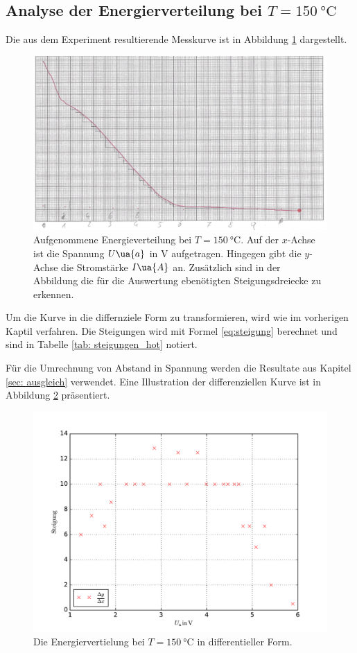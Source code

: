 \subsection{Analyse der Energierverteilung bei $T=\SI{150}{\celsius}$}
\FloatBarrier
Die aus dem Experiment resultierende Messkurve ist in Abbildung \ref{fig: messkurve_energie_hot} dargestellt. \\
\begin{figure}
  \centering
  \includegraphics[width=0.8 \textwidth]{./pics/energieverteilung_hot.png}
  \caption{Aufgenommene Energieverteilung bei $T=\SI{150}{\celsius}$. Auf der $x$-Achse ist die Spannung $U\ua{a}$ in $\si{\volt}$ aufgetragen.
          Hingegen gibt die $y$-Achse die Stromstärke $I\ua{A}$ an. Zusätzlich sind in der Abbildung die für die Auswertung ebenötigten Steigungsdreiecke zu erkennen.} %
  \label{fig: messkurve_energie_hot}
\end{figure}
Um die Kurve in die differnziele Form zu transformieren, wird wie im vorherigen Kaptil verfahren. %
Die Steigungen wird mit Formel \eqref{eq:steigung} berechnet und sind in Tabelle \ref{tab: steigungen_hot} notiert. %

Für die Umrechnung von Abstand in Spannung werden die Resultate aus Kapitel \ref{sec: ausgleich} verwendet.
Eine Illustration der differenziellen Kurve ist in Abbildung \ref{fig: energie_hot_diff} präsentiert. %
\begin{figure}
  \centering
  \includegraphics[width=0.9 \textwidth]{../Messdaten/energie_hot.pdf}
  \caption{Die Energiervertielung bei $T=\SI{150}{\celsius}$ in differentieller Form.}
  \label{fig: energie_hot_diff}
\end{figure}

